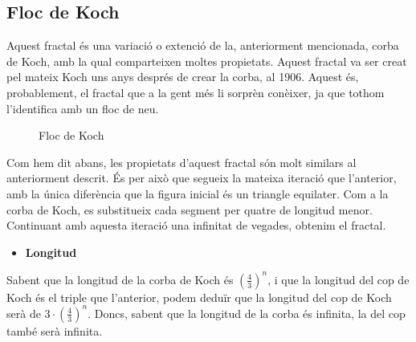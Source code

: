 \documentclass[12pt]{report}
\begin{document}
\subsection{Floc de Koch}
Aquest fractal és una variació o extenció de la, anteriorment mencionada, corba de Koch, amb la qual comparteixen moltes propietats. Aquest fractal va ser creat pel mateix Koch uns anys després de crear la corba, al 1906. Aquest és, probablement, el fractal que a la gent més li sorprèn conèixer, ja que tothom l'identifica amb un floc de neu.
 \begin{figure} [H]
 \centering
    \caption{Floc de Koch}
    \end{figure}
Com hem dit abans, les propietats d'aquest fractal són molt similars al anteriorment descrit. És per això que segueix la mateixa iteració que l'anterior, amb la única diferència que la figura inicial és un triangle equilater. 
\newline
Com a la corba de Koch, es substitueix cada segment per quatre de longitud menor. Continuant amb aquesta iteració una infinitat de vegades, obtenim el fractal.
\begin{itemize}
\item \textbf{Longitud}
\end{itemize}
Sabent que la longitud de la corba de Koch és $(\frac{4}{3})^n$, i que la longitud del cop de Koch és el triple que l'anterior, podem deduïr que la longitud del cop de Koch serà de $3\cdot(\frac{4}{3})^n$. 
\newline
Doncs, sabent que la longitud de la corba és infinita, la del cop també serà infinita.
\newline
\end{document}

